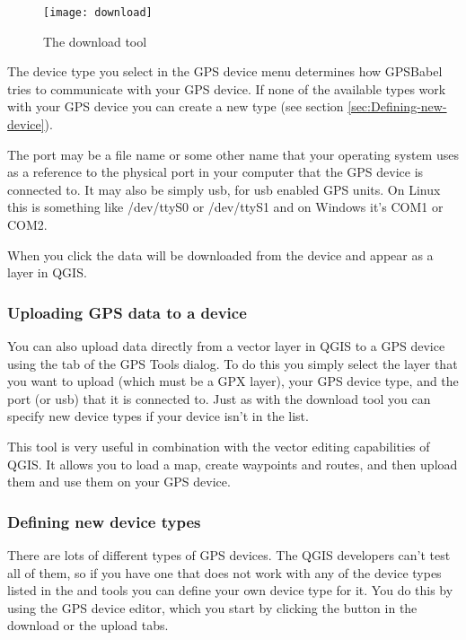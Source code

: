 \begin{figure}[ht]
   \begin{center}
\caption{\label{figure_download}The download tool \nixcaption}
\texttt{[image: download]}
   \end{center}
\end{figure}

The device type you select in the GPS device menu determines how GPSBabel tries to communicate with your GPS device.
If none of the available types work with your GPS device you can create a new type (see section \ref{sec:Defining-new-device}).

The port may be a file name or some other name that your operating system uses as a reference to the physical port in your computer that the GPS device is connected to. It may also be simply usb, for usb enabled GPS units.
\nix On Linux this is something like /dev/ttyS0 or /dev/ttyS1 and on \win Windows it's COM1 or COM2.

When you click  the data will be downloaded from the device and appear as a layer in QGIS.

\subsubsection{Uploading GPS data to a device}

You can also upload data directly from a vector layer in QGIS to a GPS device using the  tab of the GPS Tools dialog. To do this you simply select the layer that you want to upload (which must be a GPX layer), 
your GPS device type, and the port (or usb) that it is connected to.
Just as with the download tool you can specify new device types if your device isn't in the list.

This tool is very useful in combination with the vector editing capabilities of QGIS. It allows you to load a map, create waypoints and routes, and then upload them and use them on your GPS device.

\subsubsection{\label{sec:Defining-new-device}Defining new device types}

There are lots of different types of GPS devices.
The QGIS developers can't test all of them, so if you have one that does not work with any of the device types listed in the  and  tools you can define your own device type for it.
You do this by using the GPS device editor, which you start by clicking the  button in the download or the upload tabs.

